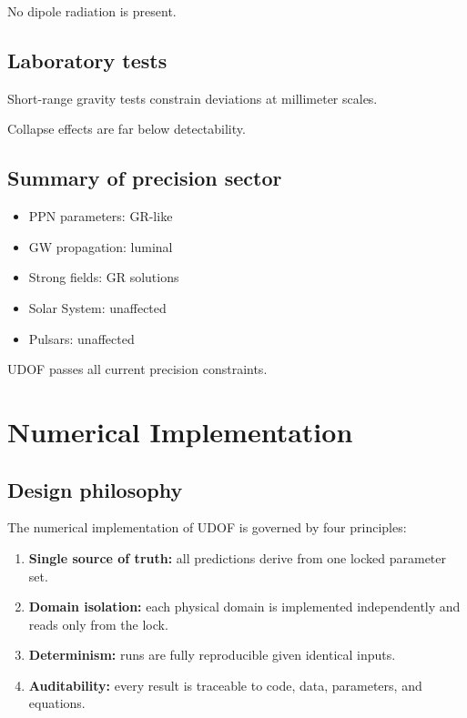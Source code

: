 \documentclass[11pt]{book}
\begin{document}
No dipole radiation is present.

\section{Laboratory tests}

Short-range gravity tests constrain deviations at millimeter scales.

Collapse effects are far below detectability.

\section{Summary of precision sector}

\begin{itemize}
\item PPN parameters: GR-like
\item GW propagation: luminal
\item Strong fields: GR solutions
\item Solar System: unaffected
\item Pulsars: unaffected
\end{itemize}

UDOF passes all current precision constraints.

\chapter{Numerical Implementation}

\section{Design philosophy}

The numerical implementation of UDOF is governed by four principles:
\begin{enumerate}
\item \textbf{Single source of truth:} all predictions derive from one locked parameter set.
\item \textbf{Domain isolation:} each physical domain is implemented independently and reads only from the lock.
\item \textbf{Determinism:} runs are fully reproducible given identical inputs.
\item \textbf{Auditability:} every result is traceable to code, data, parameters, and equations.
\end{enumerate}
\end{document}
